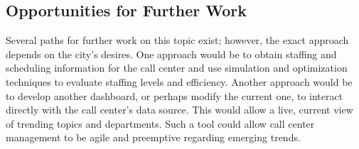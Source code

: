 \documentclass[11pt,twocolumn]{article}
\begin{document}
	\subsection{Opportunities for Further Work}

Several paths for further work on this topic exist; however, the exact approach depends on the city's desires.  One approach would be to obtain staffing and scheduling information for the call center and use simulation and optimization techniques to evaluate staffing levels and efficiency.  Another approach would be to develop another dashboard, or perhaps modify the current one, to interact directly with the call center's data source.  This would allow a live, current view of trending topics and departments.  Such a tool could allow call center management to be agile and preemptive regarding emerging trends.



\begin{thebibliography}{6}
	
\bibitem{}


\end{thebibliography}


\end{document}
